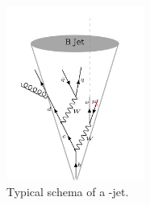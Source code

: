 \begin{figure}[htbp]
    \centering
    \includegraphics[width=0.4\textwidth]{Ch4/Img/b-jet.png}
    \begin{tcolorbox}[colback=black!5!white,colframe=white!75!black]
    \caption{Typical schema of a \bq-jet.}
    \label{fig:Jet:Cal:BCal:bJet}
    \end{tcolorbox}
    
\end{figure}

